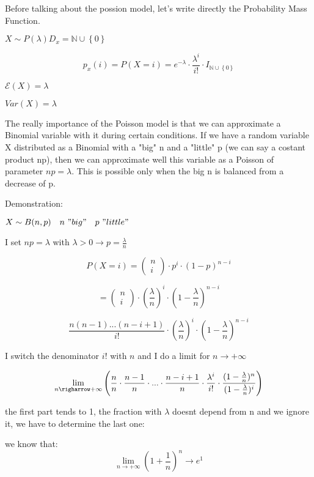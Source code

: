\documentclass{article}
\begin{document}
Before talking about the possion model, let's write directly the Probability Mass Function.

$X \sim P(\lambda) D_x = \mathbb{N} \cup \left\{0\right\}$
\bigskip

$$p_x(i) = P(X=i) = e^{- \lambda} \cdot \frac{\lambda^i}{i!} \cdot I_{\mathbb{N} \cup \left\{0\right\}}$$

\bigskip

$\mathcal E(X) = \lambda$

$Var(X) = \lambda$
\bigskip

The really importance of the Poisson model is that we can approximate a Binomial variable with it during certain conditions.
If we have a random variable X distributed as a Binomial with a "big" n and a "little" p (we can say a costant product np), then we can approximate well this variable as a Poisson of parameter $np = \lambda$.
This is possible only when the big n is balanced from a decrease of p.

\bigskip

Demonstration:

$X \sim B(n,p) \ \ \ n \ "big" \ \ \ p \ "little"$

I set $np = \lambda$ with $\lambda > 0 \longrightarrow p = \frac{\lambda}{n}$

$$P(X=i) = \left(\begin{array}{c} n \\ i \end{array} \right) \cdot p^i \cdot (1-p)^{n-i}$$

$$= \left(\begin{array}{c} n \\ i \end{array} \right) \cdot (\frac{\lambda}{n})^i \cdot (1 - \frac{\lambda}{n})^{n-i}$$

$$\frac{n(n-1)...(n-i+1)}{i!} \cdot (\frac{\lambda}{n})^i \cdot (1 - \frac{\lambda}{n})^{n-i}$$

I switch the denominator $i!$ with $n$ and I do a limit for $n \rightarrow + \infty$ 

$$\lim_{n \righarrow + \infty} \left(\frac{n}{n} \cdot \frac{n-1}{n} \cdot ... \cdot \frac{n - i + 1}{n} \cdot \frac{\lambda^i}{i!} \cdot \frac{(1 - \frac{\lambda}{n})^n}{(1 - \frac{\lambda}{n})^i}\right)$$

the first part tends to 1, the fraction with $\lambda$ doesnt depend from n and we ignore it, we have to determine the last one:
\bigskip

we know that: $$\lim_{n \rightarrow + \infty} (1 + \frac{1}{n})^n \rightarrow e^1$$
\end{document}
